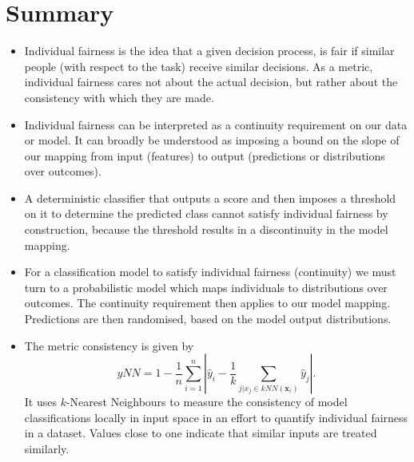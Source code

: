 \section*{Summary}

\begin{itemize}[leftmargin=*]
\item Individual fairness is the idea that a given decision process, is fair if similar people (with respect to the task) receive similar decisions. As a metric, individual fairness cares not about the actual decision, but rather about the consistency with which they are made.
%
\item Individual fairness can be interpreted as a continuity requirement on our data or model. It can broadly be understood as imposing a bound on the slope of our mapping from input (features) to output (predictions or distributions over outcomes).
%
\item A deterministic classifier that outputs a score and then imposes a threshold on it to determine the predicted class cannot satisfy individual fairness by construction, because the threshold results in a discontinuity in the model mapping.
%
\item For a classification model to satisfy individual fairness (continuity) we must turn to a probabilistic model which maps individuals to distributions over outcomes. The continuity requirement then applies to our model mapping. Predictions are then randomised, based on the model output distributions.
%
\item The metric consistency is given by
\[
yNN = 1 - \frac{1}{n} \sum_{i=1}^n \left| \hat{y}_i -
\frac{1}{k}\sum_{j|x_j\in kNN(\boldsymbol{x}_i)} \hat{y}_j \right|.
\]
It uses $k$-Nearest Neighbours to measure the consistency of model classifications locally in input space in an effort to quantify individual fairness in a dataset. Values close to one indicate that similar inputs are treated similarly. 
\end{itemize}

